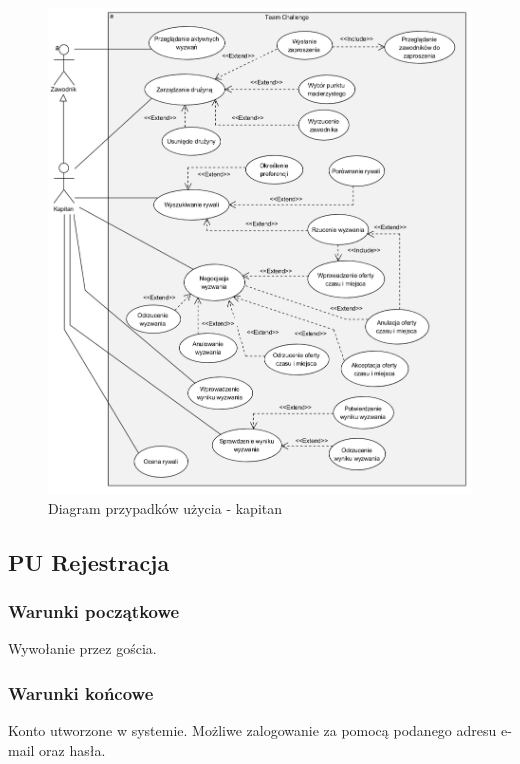 \begin{figure}[H]
\centering
\includegraphics[width=\linewidth]{04-projekt/rys/usecase3.PNG}
\caption{Diagram przypadków użycia - kapitan}
\label{fig:diagram-trad-alg-opt}
\end{figure}

\subsection{PU Rejestracja}
\subsubsection{Warunki początkowe}
Wywołanie przez gościa.
\subsubsection{Warunki końcowe}
Konto utworzone w systemie. Możliwe zalogowanie za pomocą podanego adresu e-mail oraz hasła.
